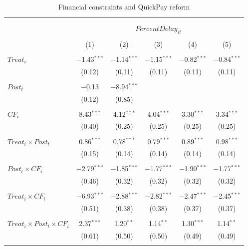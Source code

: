 \documentclass[
]{article}
\begin{document}
\begin{table}[H] \centering 
  \caption{Financial constraints and QuickPay reform} 
  \label{} 
\small 
\begin{tabular}{@{\extracolsep{-2pt}}lccccc} 
\\[-1.8ex]\hline 
\hline \\[-1.8ex] 
\\[-1.8ex] & \multicolumn{5}{c}{$PercentDelay_{it}$  } \\ 
\\[-1.8ex] & (1) & (2) & (3) & (4) & (5)\\ 
\hline \\[-1.8ex] 
 $Treat_i$ & $-$1.43$^{***}$ & $-$1.14$^{***}$ & $-$1.15$^{***}$ & $-$0.82$^{***}$ & $-$0.84$^{***}$ \\ 
  & (0.12) & (0.11) & (0.11) & (0.11) & (0.11) \\ 
  & & & & & \\ 
 $Post_t$ & $-$0.13 & $-$8.94$^{***}$ &  &  &  \\ 
  & (0.12) & (0.85) &  &  &  \\ 
  & & & & & \\ 
 $CF_i$ & 8.43$^{***}$ & 4.12$^{***}$ & 4.04$^{***}$ & 3.30$^{***}$ & 3.34$^{***}$ \\ 
  & (0.40) & (0.25) & (0.25) & (0.25) & (0.25) \\ 
  & & & & & \\ 
 $Treat_i \times Post_t$ & 0.86$^{***}$ & 0.78$^{***}$ & 0.79$^{***}$ & 0.89$^{***}$ & 0.98$^{***}$ \\ 
  & (0.15) & (0.14) & (0.14) & (0.14) & (0.14) \\ 
  & & & & & \\ 
 $Post_t \times CF_i$ & $-$2.79$^{***}$ & $-$1.85$^{***}$ & $-$1.77$^{***}$ & $-$1.90$^{***}$ & $-$1.77$^{***}$ \\ 
  & (0.46) & (0.32) & (0.32) & (0.32) & (0.32) \\ 
  & & & & & \\ 
 $Treat_i \times CF_i$ & $-$6.93$^{***}$ & $-$2.88$^{***}$ & $-$2.82$^{***}$ & $-$2.47$^{***}$ & $-$2.45$^{***}$ \\ 
  & (0.51) & (0.38) & (0.38) & (0.37) & (0.37) \\ 
  & & & & & \\ 
 $Treat_i \times Post_t \times CF_i$ & 2.37$^{***}$ & 1.20$^{**}$ & 1.14$^{**}$ & 1.30$^{***}$ & 1.14$^{**}$ \\ 
  & (0.61) & (0.50) & (0.50) & (0.49) & (0.49) \\ 
  & & & & & \\ 

\end{tabular}
\end{table}
\end{document}

